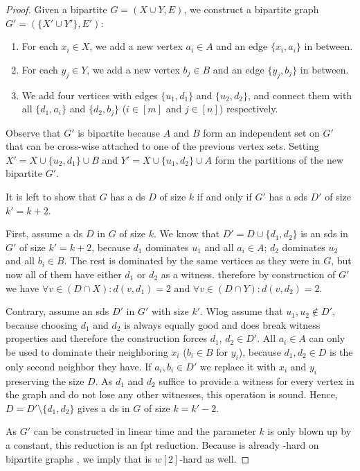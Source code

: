 \begin{proof}
    Given a bipartite $G = ( X \cup Y, E)$, we construct a bipartite graph $G' = (\{X' \cup Y'\},E')$:
    \begin{enumerate}[topsep=0pt,itemsep=-1ex,partopsep=1ex,parsep=1ex]
        \item For each $x_i \in X$, we add a new vertex $a_i \in A$  and an edge $\{x_i, a_i\}$ in between. 
        \item For each $y_j \in Y$, we add a new vertex $b_j \in B$ and an edge $\{y_j, b_j\}$ in between.
        \item We add four vertices with edges $\{u_1, d_1\}$ and $\{u_2, d_2\}$, and connect them with all $\{d_1, a_i\}$ and $\{d_2, b_j\}$ ($i \in [m]$ and $j \in [n]$) respectively.
    \end{enumerate}

    Observe that $G'$ is bipartite because $A$ and $B$ form an independent set on $G'$ that can be cross-wise attached to one of the previous vertex sets. 
    Setting  $X' = X \cup \{u_2,d_1\} \cup B$ and $Y' = X \cup \{u_1,d_2\} \cup A$ form the partitions of the new bipartite $G'$.

    It is left to show that $G$ has a ds $D$ of size $k$ if and only if $G'$ has a sds $D'$ of size $k' = k + 2$.
 
    First, assume a ds $D$ in $G$ of size $k$. 
    We know that $D' = D\cup \{d_1,d_2\}$ is an sds in $G'$ of size $k' = k + 2$, because $d_1$ dominates $u_1$ and all $a_i \in A$; $d_2$ dominates $u_2$ and all $b_i \in B$. 
    The rest is dominated by the same vertices as they were in $G$, but now all of them have either $d_1$ or $d_2$ as a witness.
    therefore by construction of $G'$ we have $\forall v \in (D \cap X): d(v, d_1) = 2$ and $\forall v \in (D \cap Y): d(v, d_2) = 2$.

    Contrary, assume an sds $D'$ in $G'$ with size $k'$. 
    Wlog assume that $u_1, u_2 \notin D'$, because choosing $d_1$ and $d_2$ is always equally good and does break witness properties and therefore the construction forces $d_1$, $d_2 \in D'$.
    All $a_i \in A$ can only be used to dominate their neighboring $x_i$ ($b_i \in B$ for $y_i$), because $d_1, d_2 \in D$ is the only second neighbor they have.
    If $a_i,b_i \in D'$ we replace it with $x_i$ and $y_i$ preserving the size $D$. As $d_1$ and $d_2$ suffice to provide a witness for every vertex in the graph and do not lose any other witnesses, this operation is sound.
    Hence, $D = D' \setminus \{ d_1,d_2\}$ gives a ds in $G$ of size $ k = k' - 2$.
    
    As $G'$ can be constructed in linear time and the parameter $k$ is only blown up by a constant, this reduction is an fpt reduction.  
    Because \dom is already \WTWOhs-hard on bipartite graphs \cite[Th. 1]{Raman2008}, we imply that \sdom is $w[2]$-hard as well.
\end{proof}

